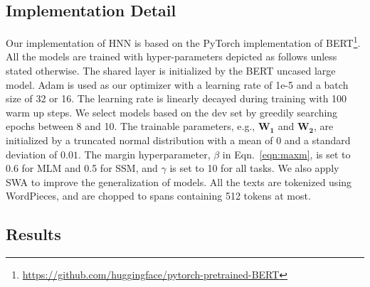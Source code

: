 \documentclass[11pt,a4paper]{article}
\newcommand{\nmodel}{HNN}
\newcommand{\wsc}{WSC}
\begin{document}
\begin{table}[!ht]
\begin{enumerate}
\end{enumerate}
\caption{Examples of transforming WNLI to {\wsc} format. Note that the text highlighted by \textcolor{brown}{brown} is the longest common substring from the left part of pronoun \textit{it}, and the text highlighted by \textcolor{violet}{violet} is the longest common substring from its right.}
\label{tab:convert}
\end{table}

\subsection{Implementation Detail}
\label{exp:imp}
Our implementation of {\nmodel} is based on the PyTorch implementation of BERT\footnote{\url{https://github.com/huggingface/pytorch-pretrained-BERT}}. All the models are trained with hyper-parameters depicted as follows unless stated otherwise.
The shared layer is initialized by the BERT uncased large model. Adam \cite{kingma2014adam} is used as our optimizer with a learning rate of 1e-5 and a batch size of 32 or 16. The learning rate is linearly decayed during training with 100 warm up steps. We select models based on the dev set by greedily searching epochs between 8 and 10. The trainable parameters, e.g., $\mathbf{W_1}$ and $\mathbf{W_2}$, are initialized by a truncated normal distribution with a mean of $0$ and a standard deviation of $0.01$.
The margin hyperparameter, $\beta$ in Eqn.~\ref{eqn:maxm}, is set to 0.6 for MLM and 0.5 for SSM, and $\gamma$ is set to 10 for all tasks.  
We also apply SWA \cite{izmailov2018averaging} to improve the generalization of models. All the texts are tokenized using WordPieces, and are chopped to spans containing 512 tokens at most.




\subsection{Results}
\label{exp:results}
\end{document}
